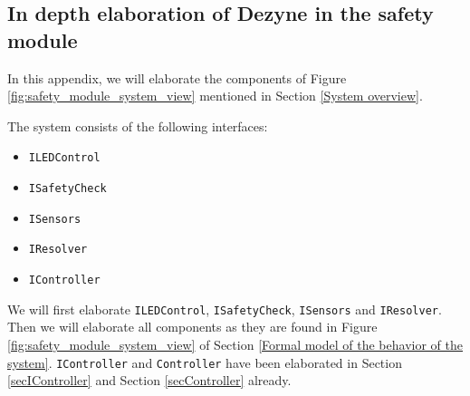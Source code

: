 \documentclass[12pt]{scrreprt}
\begin{document}
\begin{appendices}
\chapter{In depth elaboration of Dezyne in the safety module}
\label{In depth elaboration of Dezyne in the safety module}
In this appendix, we will elaborate the components of Figure \ref{fig:safety_module_system_view} mentioned in Section \ref{System overview}.
\par
The system consists of the following interfaces:

\begin{itemize}
    \item \texttt{ILEDControl}
    \item \texttt{ISafetyCheck}
    \item \texttt{ISensors}
    \item \texttt{IResolver}
    \item \texttt{IController}
\end{itemize}

We will first elaborate \texttt{ILEDControl}, \texttt{ISafetyCheck}, \texttt{ISensors} and \texttt{IResolver}. Then we will elaborate all components as they are found in Figure \ref{fig:safety_module_system_view} of Section \ref{Formal model of the behavior of the system}. \texttt{IController} and \texttt{Controller} have been elaborated in Section \ref{secIController} and Section \ref{secController} already.


\end{appendices}
\end{document}
